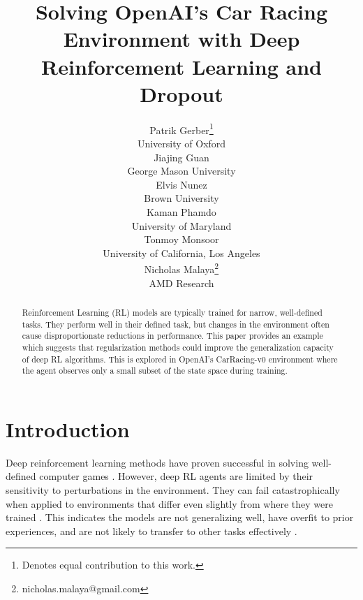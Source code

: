 \documentclass{article}
\title{ %
  Solving OpenAI's
  Car Racing Environment with Deep Reinforcement Learning and Dropout}
\author{
  Patrik Gerber\thanks{Denotes equal contribution to this work.}\\
  University of Oxford \\
  \And
  Jiajing Guan\samethanks \\
  George Mason University \\ 
  \And
  Elvis Nunez\samethanks \\
  Brown University \\
  \And
  Kaman Phamdo\samethanks \\
  University of Maryland \\
  \And
  Tonmoy Monsoor \\
  University of California, Los Angeles \\
  \And
  Nicholas Malaya\thanks{nicholas.malaya@gmail.com} \\ %
  AMD Research \\ 
}
\begin{document}

\maketitle

\begin{abstract}

  


  
Reinforcement Learning (RL) models are typically trained for
narrow, well-defined tasks. They perform well in their defined task,
but changes in the environment often cause disproportionate reductions
in performance. This paper provides an example which suggests that
regularization methods could improve the generalization capacity of
deep RL algorithms.
This is explored in OpenAI’s CarRacing-v0 environment where the agent
observes only a small subset of the state space during training.
\end{abstract}

\vspace{-2mm}
\section{Introduction}
Deep reinforcement learning methods have proven successful in solving
well-defined computer games 
\cite{mnih2013playing,silver2017mastering,zambaldi2018relational,bansal2017emergent}. 
However, deep RL agents are limited by their sensitivity
to perturbations in the environment. They can fail catastrophically
when applied to environments that differ even slightly from where they
were trained \cite{kansky2017schema,taylor2009transfer}. This indicates
the models are not generalizing well, have overfit to prior
experiences, and are not likely to transfer to other tasks
effectively \cite{dibangoye2018learning}. 
\end{document}
